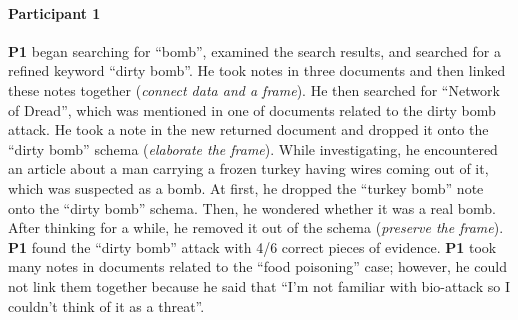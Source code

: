 \paragraph{Participant 1}
\textbf{P1} began searching for ``bomb'', examined the search results, and searched for  a refined keyword ``dirty bomb''. He took notes in three documents and then linked these notes together (\emph{connect data and a frame}). He then searched for ``Network of Dread'', which was mentioned in one of documents related to the dirty bomb attack. He took a note in the new returned document and dropped it onto the ``dirty bomb'' schema (\emph{elaborate the frame}). While investigating, he encountered an article about a man carrying a frozen turkey having wires coming out of it, which was suspected as a bomb. At first, he dropped the ``turkey bomb'' note onto the ``dirty bomb'' schema. Then, he wondered whether it was a real bomb. After thinking for a while, he removed it out of the schema (\emph{preserve the frame}). \textbf{P1} found the ``dirty bomb'' attack with 4/6 correct pieces of evidence. \textbf{P1} took many notes in documents related to the ``food poisoning'' case; however, he could not link them together because he said that ``I'm not familiar with bio-attack so I couldn't think of it as a threat''.

